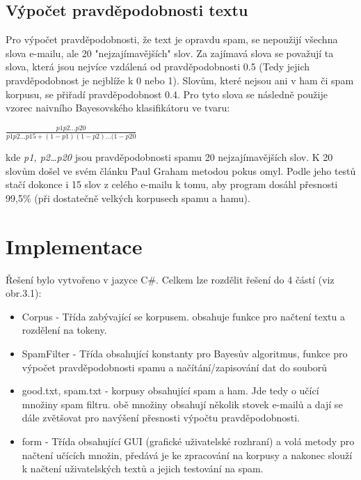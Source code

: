 \documentclass{semestralka}
\begin{document}
\section{Výpočet pravděpodobnosti textu}
Pro výpočet pravděpodobnosti, že text je opravdu spam, se nepoužijí všechna slova e-mailu, ale 20 "nejzajímavějších" slov. Za zajímavá slova se považují ta slova, která jsou nejvíce vzdálená od pravděpodobnosti 0.5 (Tedy jejich pravděpodobnost je nejblíže k 0 nebo 1). Slovům, které nejsou ani v ham či spam korpusu, se přiřadí pravděpodobnost 0.4. Pro tyto slova se následně použije vzorec naivního Bayesovského klasifikátoru ve tvaru:

\begin{center}
$\frac{p1p2\dots p20}{p1p2\dots p15 + (1 - p1)(1 - p2)\dots (1 - p20}$
\end{center}

kde \textit{p1, p2\dots p20} jsou pravděpodobnosti spamu 20 nejzajímavějších slov. K 20 slovům došel ve svém článku Paul Graham metodou pokus omyl. Podle jeho testů stačí dokonce i 15 slov z celého e-mailu k tomu, aby program dosáhl přesnosti 99,5\% (při dostatečně velkých korpusech spamu a hamu).

\chapter{Implementace}
Řešení bylo vytvořeno v jazyce C\#. Celkem lze rozdělit řešení do 4 částí (viz obr.3.1):
\begin{itemize}
\item
Corpus - Třída zabývající se korpusem. obsahuje funkce pro načtení textu a rozdělení na tokeny.
\item
SpamFilter - Třída obsahující konstanty pro Bayesův algoritmus, funkce pro výpočet pravděpodobnosti spamu a načítání/zapisování dat do souborů
\item
good.txt, spam.txt - korpusy obsahující spam a ham. Jde tedy o učící množiny spam filtru. obě množiny obsahují několik stovek e-mailů a dají se dále zvětšovat pro navýšení přesnosti výpočtu pravděpodobnosti.
\item
form - Třída obsahující GUI (grafické uživatelské rozhraní) a volá metody pro načtení učících množin, předává je ke zpracování na korpusy a nakonec slouží k načtení uživatelských textů a jejich testování na spam.
\end{itemize}
\end{document}
